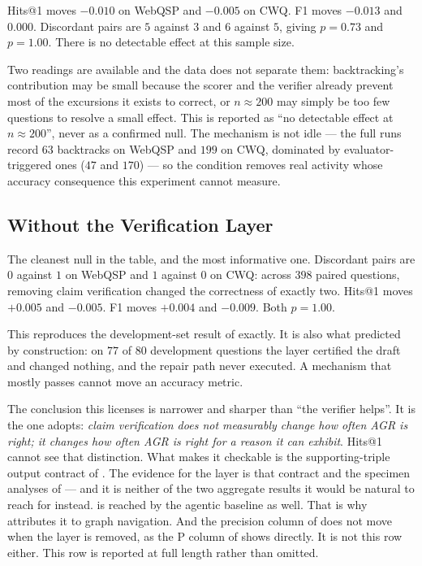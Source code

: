 Hits@1 moves $-0.010$ on WebQSP and $-0.005$ on CWQ. F1 moves $-0.013$ and
$0.000$. Discordant pairs are $5$ against $3$ and $6$
against $5$, giving $p = 0.73$ and $p = 1.00$. There is no detectable effect at
this sample size.

Two readings are available and the data does not separate them: backtracking's
contribution may be small because the scorer and the verifier already prevent
most of the excursions it exists to correct, or $n \approx 200$ may simply be
too few questions to resolve a small effect. This is reported as ``no detectable
effect at $n \approx 200$'', never as a confirmed null. The mechanism is not
idle --- the full runs record $63$ backtracks on WebQSP and $199$ on CWQ,
dominated by evaluator-triggered ones ($47$ and $170$) --- so the condition
removes real activity whose accuracy consequence this experiment cannot measure.

\subsection{Without the Verification Layer}

The cleanest null in the table, and the most informative one. Discordant pairs
are $0$ against $1$ on WebQSP and $1$ against $0$ on
CWQ: across $398$ paired questions, removing claim verification changed the
correctness of exactly two. Hits@1 moves $+0.005$ and $-0.005$. F1 moves
$+0.004$ and $-0.009$. Both $p = 1.00$.

This reproduces the development-set result of  exactly. It
is also what  predicted by construction: on $77$ of
$80$ development questions the layer certified the draft and changed nothing,
and the repair path never executed. A mechanism that mostly passes cannot move
an accuracy metric.

The conclusion this licenses is narrower and sharper than ``the verifier
helps''. It is the one  adopts: \emph{claim verification
does not measurably change how often AGR is right; it changes how often AGR is
right for a reason it can exhibit}. Hits@1 cannot see that distinction. What
makes it checkable is the supporting-triple output contract of
. The evidence for the layer is that contract and the
specimen analyses of  --- and it is neither of the two
aggregate results it would be natural to reach for instead.
 is reached by the agentic baseline as well. That is why
 attributes it to graph navigation. And the precision column
of  does not move when the layer is removed, as the P column of
 shows directly. It is not this row either. This row is
reported at full length rather than omitted.

